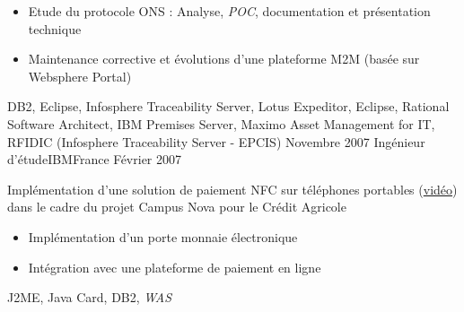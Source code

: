 \begin{experiences}
{\begin{itemize}
                        \item Etude du protocole ONS : Analyse, \emph{POC}, documentation et présentation technique     
                        \item Maintenance corrective et évolutions d'une plateforme M2M (basée sur Websphere Portal)    
                      \end{itemize}
                    }
                    {
                      DB2, Eclipse, Infosphere Traceability Server, Lotus Expeditor, Eclipse, 
                      Rational Software Architect, IBM Premises Server, Maximo Asset Management for IT, RFIDIC (Infosphere Traceability Server - EPCIS)
                    }
  \emptySeparator
  \experience
  {Novembre 2007}  {Ingénieur d'étude}{IBM}{France}
  {Février 2007}   {
                      Implémentation d'une solution de paiement NFC sur téléphones portables (\href{http://www.nouvo.ch/s-007}{vidéo}) 
                      dans le cadre du projet Campus Nova pour le Crédit Agricole  
                      \begin{itemize}
                        \item Implémentation d'un porte monnaie électronique                                            
                        \item Intégration avec une plateforme de paiement en ligne  
                      \end{itemize}
                  }
                  {J2ME, Java Card, DB2, \emph{WAS}}  
\end{experiences}
